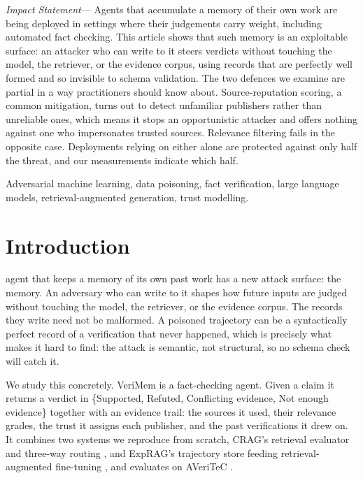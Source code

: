 \documentclass[journal]{IEEEtran}
\newenvironment{impactstatement}
  {\par\vspace{1.5ex}\noindent\textit{Impact Statement}---\ignorespaces}
  {\par\vspace{1.5ex}}
\begin{document}
\begin{impactstatement}
Agents that accumulate a memory of their own work are being deployed in
settings where their judgements carry weight, including automated fact
checking. This article shows that such memory is an exploitable surface: an
attacker who can write to it steers verdicts without touching the model, the
retriever, or the evidence corpus, using records that are perfectly well formed
and so invisible to schema validation. The two defences we examine are
partial in a way practitioners should know about. Source-reputation scoring, a
common mitigation, turns out to detect unfamiliar publishers rather than
unreliable ones, which means it stops an opportunistic attacker and offers
nothing against one who impersonates trusted sources. Relevance filtering fails
in the opposite case. Deployments relying on either alone are protected against
only half the threat, and our measurements indicate which half.
\end{impactstatement}

\begin{IEEEkeywords}
Adversarial machine learning, data poisoning, fact verification,
large language models, retrieval-augmented generation, trust modelling.
\end{IEEEkeywords}

\section{Introduction}
 agent that keeps a memory of its own past
work has a new attack surface: the memory. An adversary who can write to it
shapes how future inputs are judged without touching the model, the retriever,
or the evidence corpus. The records they write need not be malformed. A
poisoned trajectory can be a syntactically perfect record of a verification that
never happened, which is precisely what makes it hard to find: the attack is
semantic, not structural, so no schema check will catch it.

We study this concretely. VeriMem is a fact-checking agent. Given a claim it
returns a verdict in \{Supported, Refuted, Conflicting evidence, Not enough
evidence\} together with an evidence trail: the sources it used, their relevance
grades, the trust it assigns each publisher, and the past verifications it drew
on. It combines two systems we reproduce from scratch, CRAG's retrieval
evaluator and three-way routing \cite{yan2024crag}, and ExpRAG's trajectory
store feeding retrieval-augmented fine-tuning \cite{ferraz2026exprag}, and
evaluates on AVeriTeC \cite{schlichtkrull2023averitec}.
\end{document}
